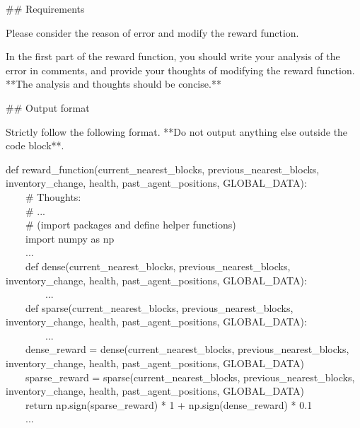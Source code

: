 \textasciigrave \textasciigrave \textasciigrave 



\#\# Requirements

Please consider the reason of error and modify the reward function. 

In the first part of the reward function, you should write your analysis of the error in comments, and provide your thoughts of modifying the reward function. **The analysis and thoughts should be concise.**





\#\# Output format

Strictly follow the following format. **Do not output anything else outside the code block**.





def reward\_function(current\_nearest\_blocks, previous\_nearest\_blocks, inventory\_change, health, past\_agent\_positions, GLOBAL\_DATA):
\\
\hbox{\ \ \ \ }\# Thoughts:\\
\hbox{\ \ \ \ }\# ...\\
\hbox{\ \ \ \ }\# (import packages and define helper functions)\\
\hbox{\ \ \ \ }import numpy as np\\
\hbox{\ \ \ \ }...\\
\hbox{\ \ \ \ }def dense(current\_nearest\_blocks, previous\_nearest\_blocks, inventory\_change, health, past\_agent\_positions, GLOBAL\_DATA):\\
\hbox{\ \ \ \ \ \ \ \ }...\\
\hbox{\ \ \ \ }def sparse(current\_nearest\_blocks, previous\_nearest\_blocks, inventory\_change, health, past\_agent\_positions, GLOBAL\_DATA):\\
\hbox{\ \ \ \ \ \ \ \ }...\\
\hbox{\ \ \ \ }dense\_reward = dense(current\_nearest\_blocks, previous\_nearest\_blocks, inventory\_change, health, past\_agent\_positions, GLOBAL\_DATA)\\
\hbox{\ \ \ \ }sparse\_reward = sparse(current\_nearest\_blocks, previous\_nearest\_blocks, inventory\_change, health, past\_agent\_positions, GLOBAL\_DATA)\\
\hbox{\ \ \ \ }return np.sign(sparse\_reward) * 1 + np.sign(dense\_reward) * 0.1\\
\hbox{\ \ \ \ }...\\
